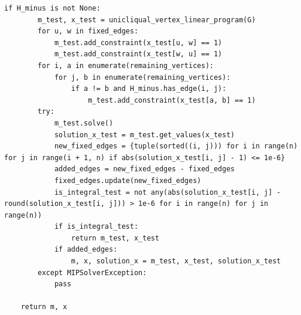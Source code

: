 \begin{lstlisting}[style=python, caption={Recursive Vertex Deletion Linear Program.}, label={lst::vertex_deletion_recursive_linear_program}]
    if H_minus is not None:
        m_test, x_test = unicliqual_vertex_linear_program(G)
        for u, w in fixed_edges:
            m_test.add_constraint(x_test[u, w] == 1)
            m_test.add_constraint(x_test[w, u] == 1)
        for i, a in enumerate(remaining_vertices):
            for j, b in enumerate(remaining_vertices):
                if a != b and H_minus.has_edge(i, j):
                    m_test.add_constraint(x_test[a, b] == 1)
        try:
            m_test.solve()
            solution_x_test = m_test.get_values(x_test)
            new_fixed_edges = {tuple(sorted((i, j))) for i in range(n) for j in range(i + 1, n) if abs(solution_x_test[i, j] - 1) <= 1e-6}
            added_edges = new_fixed_edges - fixed_edges
            fixed_edges.update(new_fixed_edges)
            is_integral_test = not any(abs(solution_x_test[i, j] - round(solution_x_test[i, j])) > 1e-6 for i in range(n) for j in range(n))
            if is_integral_test:
                return m_test, x_test
            if added_edges:
                m, x, solution_x = m_test, x_test, solution_x_test
        except MIPSolverException:
            pass

    return m, x
\end{lstlisting}


